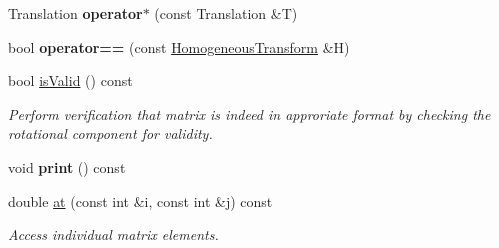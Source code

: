 \begin{DoxyCompactItemize}
\item 
\hypertarget{class_homogeneous_transform_a8474418655ce3655e0c185afe7e4abd7}{Translation {\bfseries operator$\ast$} (const Translation \&T)}\label{class_homogeneous_transform_a8474418655ce3655e0c185afe7e4abd7}

\item 
\hypertarget{class_homogeneous_transform_af2f47018fcd470cee5ba7e7c69730d2c}{bool {\bfseries operator==} (const \hyperlink{class_homogeneous_transform}{Homogeneous\+Transform} \&H)}\label{class_homogeneous_transform_af2f47018fcd470cee5ba7e7c69730d2c}

\item 
\hypertarget{class_homogeneous_transform_a1d63d753b0f5b20e97e861da4a600b4f}{bool \hyperlink{class_homogeneous_transform_a1d63d753b0f5b20e97e861da4a600b4f}{is\+Valid} () const }\label{class_homogeneous_transform_a1d63d753b0f5b20e97e861da4a600b4f}

\begin{DoxyCompactList}\small\item\em Perform verification that matrix is indeed in approriate format by checking the rotational component for validity. \end{DoxyCompactList}\item 
\hypertarget{class_homogeneous_transform_a957a28b2e652d65ff28b3568e373583c}{void {\bfseries print} () const }\label{class_homogeneous_transform_a957a28b2e652d65ff28b3568e373583c}

\item 
double \hyperlink{class_homogeneous_transform_a2aa4fe380fe46ffb337f665fe9f4c8a5}{at} (const int \&i, const int \&j) const 
\begin{DoxyCompactList}\small\item\em Access individual matrix elements. \end{DoxyCompactList}\end{DoxyCompactItemize}
